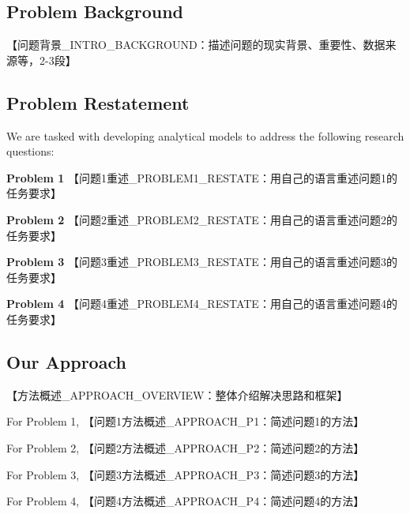 \documentclass{mcmthesis}
\begin{document}
\subsection{Problem Background}

【问题背景_INTRO_BACKGROUND：描述问题的现实背景、重要性、数据来源等，2-3段】

\subsection{Problem Restatement}

We are tasked with developing analytical models to address the following research questions:

\textbf{Problem 1} 【问题1重述_PROBLEM1_RESTATE：用自己的语言重述问题1的任务要求】

\textbf{Problem 2} 【问题2重述_PROBLEM2_RESTATE：用自己的语言重述问题2的任务要求】

\textbf{Problem 3} 【问题3重述_PROBLEM3_RESTATE：用自己的语言重述问题3的任务要求】

\textbf{Problem 4} 【问题4重述_PROBLEM4_RESTATE：用自己的语言重述问题4的任务要求】

\subsection{Our Approach}

【方法概述_APPROACH_OVERVIEW：整体介绍解决思路和框架】

For Problem 1, 【问题1方法概述_APPROACH_P1：简述问题1的方法】

For Problem 2, 【问题2方法概述_APPROACH_P2：简述问题2的方法】

For Problem 3, 【问题3方法概述_APPROACH_P3：简述问题3的方法】

For Problem 4, 【问题4方法概述_APPROACH_P4：简述问题4的方法】

\end{document}
